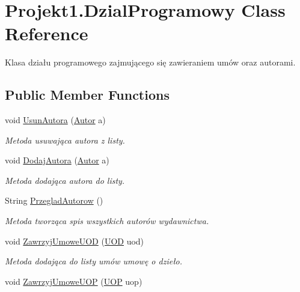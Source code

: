 \hypertarget{class_projekt1_1_1_dzial_programowy}{}\section{Projekt1.\+Dzial\+Programowy Class Reference}
\label{class_projekt1_1_1_dzial_programowy}


Klasa działu programowego zajmującego się zawieraniem umów oraz autorami.  


\subsection*{Public Member Functions}
\begin{DoxyCompactItemize}
\item 
void \mbox{\hyperlink{class_projekt1_1_1_dzial_programowy_abb3d14c312ae10ce95b8b7800b6a7a78}{Usun\+Autora}} (\mbox{\hyperlink{class_projekt1_1_1_autor}{Autor}} a)
\begin{DoxyCompactList}\small\item\em Metoda usuwająca autora z listy. \end{DoxyCompactList}\item 
void \mbox{\hyperlink{class_projekt1_1_1_dzial_programowy_ae3036a341f8a8ecc9c4069cc3604a8d3}{Dodaj\+Autora}} (\mbox{\hyperlink{class_projekt1_1_1_autor}{Autor}} a)
\begin{DoxyCompactList}\small\item\em Metoda dodająca autora do listy. \end{DoxyCompactList}\item 
String \mbox{\hyperlink{class_projekt1_1_1_dzial_programowy_aa6a32f8a0d11777efb667ec30b6d0441}{Przeglad\+Autorow}} ()
\begin{DoxyCompactList}\small\item\em Metoda tworząca spis wszystkich autorów wydawnictwa. \end{DoxyCompactList}\item 
void \mbox{\hyperlink{class_projekt1_1_1_dzial_programowy_ae4c62d15b8d0083f6501c44f5255abb6}{Zawrzyj\+Umowe\+U\+OD}} (\mbox{\hyperlink{class_projekt1_1_1_u_o_d}{U\+OD}} uod)
\begin{DoxyCompactList}\small\item\em Metoda dodająca do listy umów umowę o dzieło. \end{DoxyCompactList}\item 
void \mbox{\hyperlink{class_projekt1_1_1_dzial_programowy_a7814d93c057013c72d4b5f7153ed3530}{Zawrzyj\+Umowe\+U\+OP}} (\mbox{\hyperlink{class_projekt1_1_1_u_o_p}{U\+OP}} uop)

\end{DoxyCompactItemize}
